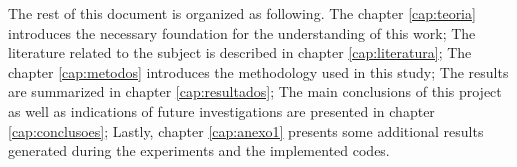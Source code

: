 The rest of this document is organized as following. The chapter \ref{cap:teoria} introduces the necessary foundation for the understanding of this work; The literature related to the subject is described in chapter \ref{cap:literatura}; The chapter \ref{cap:metodos} introduces the methodology used in this study; The results are summarized in chapter \ref{cap:resultados}; The main conclusions of this project as well as indications of future investigations are presented in chapter \ref{cap:conclusoes}; Lastly, chapter \ref{cap:anexo1} presents some additional results generated during the experiments and the implemented codes.